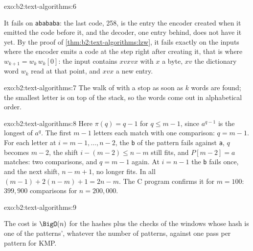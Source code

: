 \begin{solution}{exo:b2:text-algorithms:6}

It fails on \texttt{abababa}: the last code, 258, is the entry the encoder created when it emitted the code before it,
and the decoder, one entry behind, does not have it yet. By the proof of \cref{thm:b2:text-algorithms:lzw}, it fails
exactly on the inputs where the encoder emits a code at the step right after creating it, that is where $w_{k+1} = w_k\,
w_k[0]$: the input contains $x v x v x$ with $x$ a byte, $xv$ the dictionary word $w_k$ read at that point, and $xvx$ a
new entry.
\end{solution}

\begin{solution}{exo:b2:text-algorithms:7}
The walk of  with a stop as soon as $k$ words are found; the smallest letter is on top of the stack, so the
words come out in alphabetical order.


\end{solution}

\begin{solution}{exo:b2:text-algorithms:8}
Here $\pi(q) = q - 1$ for $q \leq m - 1$, since $a^{q-1}$ is the longest  of $a^q$. The first $m - 1$ letters each
match with one comparison: $q = m - 1$. For each letter at $i = m - 1, \dots, n - 2$, the \texttt{b} of the pattern fails
against \texttt{a}, $q$ becomes $m - 2$, the shift $i - (m - 2) \leq n - m$ still fits, and $P[m - 2] = a$ matches: two
comparisons, and $q = m - 1$ again. At $i = n - 1$ the \texttt{b} fails once, and the next shift, $n - m + 1$, no longer
fits. In all $(m - 1) + 2(n - m) + 1 = 2n - m$. The C program confirms it for $m = 100$: $399{,}900$ comparisons for
$n = 200{,}000$.
\end{solution}

\begin{solution}{exo:b2:text-algorithms:9}


The cost is $\BigO(n)$ for the hashes plus the checks of the windows whose hash is one of the patterns', whatever the
number of patterns, against one pass per pattern for KMP.
\end{solution}

